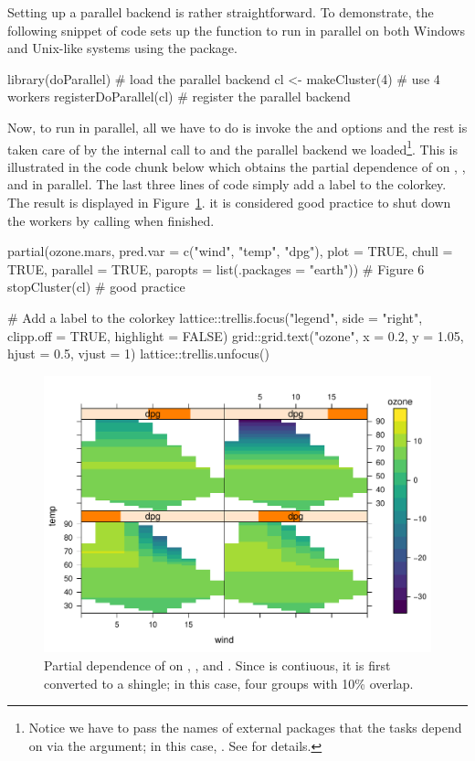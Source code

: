 Setting up a parallel backend is rather straightforward. To demonstrate, the following snippet of code sets up the  function to run in parallel on both Windows and Unix-like systems using the  package.
\begin{example}
library(doParallel)  # load the parallel backend
cl <- makeCluster(4)  # use 4 workers
registerDoParallel(cl)  # register the parallel backend
\end{example}
Now, to run  in parallel, all we have to do is invoke the  and  options and the rest is taken care of by the internal call to  and the parallel backend we loaded\footnote{Notice we have to pass the names of external packages that the tasks depend on via the  argument; in this case, . See  for details.}. This is illustrated in the code chunk below which obtains the partial dependence of  on , , and  in parallel. The last three lines of code simply add a label to the colorkey. The result is displayed in Figure~\ref{fig:partial_par}.  it is considered good practice to shut down the workers by calling  when finished.
\begin{example}
partial(ozone.mars, pred.var = c("wind", "temp", "dpg"), plot = TRUE,
        chull = TRUE, parallel = TRUE, paropts = list(.packages = "earth"))  # Figure 6
stopCluster(cl)  # good practice

# Add a label to the colorkey
lattice::trellis.focus("legend", side = "right", clipp.off = TRUE, highlight = FALSE)
grid::grid.text("ozone", x = 0.2, y = 1.05, hjust = 0.5, vjust = 1)
lattice::trellis.unfocus()
\end{example}

\begin{figure}[!htbp]
  \centering
  \includegraphics[width=0.8\linewidth]{partial_par}
  \caption{Partial dependence of  on , , and . Since  is contiuous, it is first converted to a shingle; in this case, four groups with 10\% overlap.}
  \label{fig:partial_par}
\end{figure}

